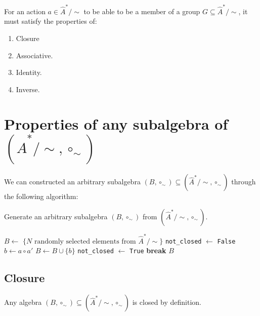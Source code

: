 For an action $a \in \hat{A}^{*}/\sim$ to be able to be a member of a group $G \subseteq \hat{A}^{*}/\sim$, it must satisfy the properties of:
\begin{enumerate}
    \item Closure
    \item Associative.
    \item Identity.
    \item Inverse.
\end{enumerate}

\section{Properties of any subalgebra of $(\hat{A}^{*}/\sim, \circ_{\sim})$}

We can constructed an arbitrary subalgebra $(B, \circ_{\sim}) \subseteq (\hat{A}^{*}/\sim, \circ_{\sim})$ through the following algorithm:
\begin{algorithm}[H]
\caption{
Generate an arbitrary subalgebra $(B, \circ_{\sim})$ from $(\hat{A}^{*}/\sim, \circ_{\sim})$.
}
\hrulefill
\begin{algorithmic}[1]
\State $B \gets$ $\{ N \text{ randomly selected elements from } \hat{A}^{*}/\sim \}$
    \State \texttt{not\_closed} $\gets$ \texttt{False}
        \State $b \gets a \circ a'$
            \State $B \gets B \cup \{b\}$
            \State \texttt{not\_closed} $\gets$ \texttt{True}
        \EndIf
    \EndFor
        \State \textbf{break}
    \EndIf
\EndWhile
\State \Return $B$
\EndProcedure
\end{algorithmic}
\end{algorithm}

\subsection{Closure}
Any algebra $(B, \circ_{\sim}) \subseteq (\hat{A}^{*}/\sim, \circ_{\sim})$ is closed by definition.

